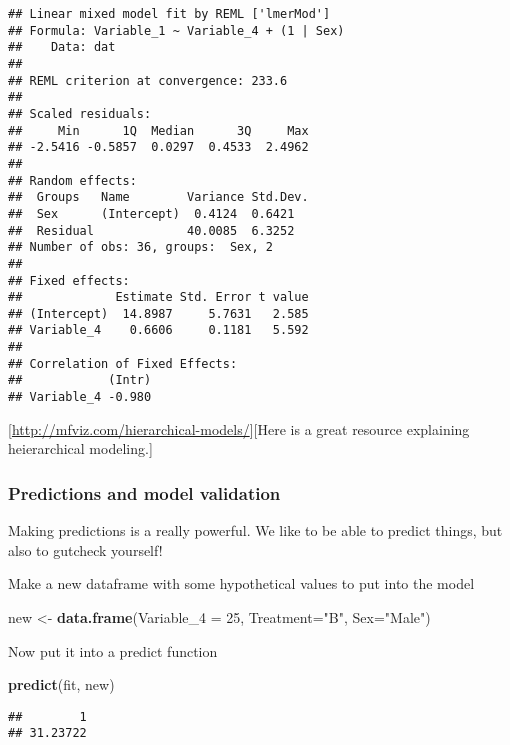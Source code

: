 \documentclass[
]{article}
\newenvironment{Shaded}{\begin{snugshade}}{\end{snugshade}}
\newcommand{\DataTypeTok}[1]{\textcolor[rgb]{0.13,0.29,0.53}{#1}}
\newcommand{\DecValTok}[1]{\textcolor[rgb]{0.00,0.00,0.81}{#1}}
\newcommand{\KeywordTok}[1]{\textcolor[rgb]{0.13,0.29,0.53}{\textbf{#1}}}
\newcommand{\NormalTok}[1]{#1}
\newcommand{\StringTok}[1]{\textcolor[rgb]{0.31,0.60,0.02}{#1}}
\begin{document}
\begin{verbatim}
## Linear mixed model fit by REML ['lmerMod']
## Formula: Variable_1 ~ Variable_4 + (1 | Sex)
##    Data: dat
## 
## REML criterion at convergence: 233.6
## 
## Scaled residuals: 
##     Min      1Q  Median      3Q     Max 
## -2.5416 -0.5857  0.0297  0.4533  2.4962 
## 
## Random effects:
##  Groups   Name        Variance Std.Dev.
##  Sex      (Intercept)  0.4124  0.6421  
##  Residual             40.0085  6.3252  
## Number of obs: 36, groups:  Sex, 2
## 
## Fixed effects:
##             Estimate Std. Error t value
## (Intercept)  14.8987     5.7631   2.585
## Variable_4    0.6606     0.1181   5.592
## 
## Correlation of Fixed Effects:
##            (Intr)
## Variable_4 -0.980
\end{verbatim}

{[}\url{http://mfviz.com/hierarchical-models/}{]}{[}Here is a great
resource explaining heierarchical modeling.{]}

\hypertarget{predictions-and-model-validation}{%
\subsubsection{Predictions and model
validation}\label{predictions-and-model-validation}}

Making predictions is a really powerful. We like to be able to predict
things, but also to gutcheck yourself!

Make a new dataframe with some hypothetical values to put into the model

\begin{Shaded}
\begin{Highlighting}[]
\NormalTok{new <-}\StringTok{ }\KeywordTok{data.frame}\NormalTok{(}\DataTypeTok{Variable_4 =} \DecValTok{25}\NormalTok{, }\DataTypeTok{Treatment=}\StringTok{"B"}\NormalTok{, }\DataTypeTok{Sex=}\StringTok{"Male"}\NormalTok{)}
\end{Highlighting}
\end{Shaded}

Now put it into a predict function

\begin{Shaded}
\begin{Highlighting}[]
\KeywordTok{predict}\NormalTok{(fit, new)}
\end{Highlighting}
\end{Shaded}

\begin{verbatim}
##        1 
## 31.23722
\end{verbatim}
\end{document}
